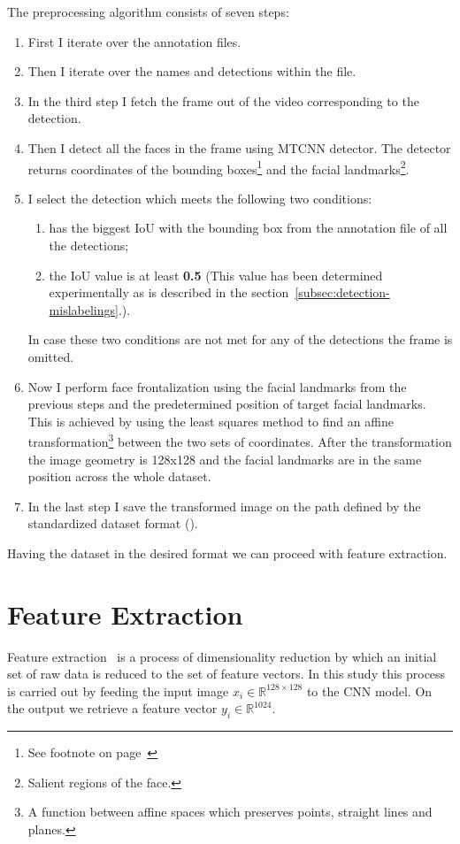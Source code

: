 The preprocessing algorithm consists of seven steps:
\begin{enumerate}
    \item First I iterate over the annotation files.
    \item Then I iterate over the names and detections within the file.
    \item In the third step I fetch the frame out of the video corresponding to the detection.
    \item Then I detect all the faces in the frame using MTCNN detector.
    The detector returns coordinates of the bounding boxes\footnote{See footnote on page~\pageref{foot:bbox}} and the
    facial landmarks\footnote{Salient regions of the face.}.
    \item I select the detection which meets the following two conditions:
    \begin{enumerate}
        \item has the biggest IoU with the bounding box from the annotation file of all the detections;
        \item the IoU value is at least \textbf{0.5} (This value has been determined experimentally as
        is described in the section~\ref{subsec:detection-mislabelings}.).
    \end{enumerate}
    In case these two conditions are not met for any of the detections the frame is omitted.
    \item Now I perform face frontalization using the facial landmarks from the previous steps and the predetermined
    position of target facial landmarks.
    This is achieved by using the least squares method to find an affine transformation\footnote{A function between
    affine spaces which preserves points, straight lines and planes.} between the two sets of coordinates.
    After the transformation the image geometry is 128x128 and the facial landmarks are in the same position across
    the whole dataset.
    \item In the last step I save the transformed image on the path defined by the standardized dataset format
    ().
\end{enumerate}

Having the dataset in the desired format we can proceed with feature extraction.

\section{Feature Extraction}\label{sec:feature-extraction}
Feature extraction~\cite{FeEx} is a process of dimensionality reduction by which an initial set of raw data
is reduced to the set of feature vectors.
In this study this process is carried out by feeding the input image $x_i \in \mathbb{R}^{128\times128 }$ to the CNN model.
On the output we retrieve a feature vector $y_i \in \mathbb{R}^{1024}$.

